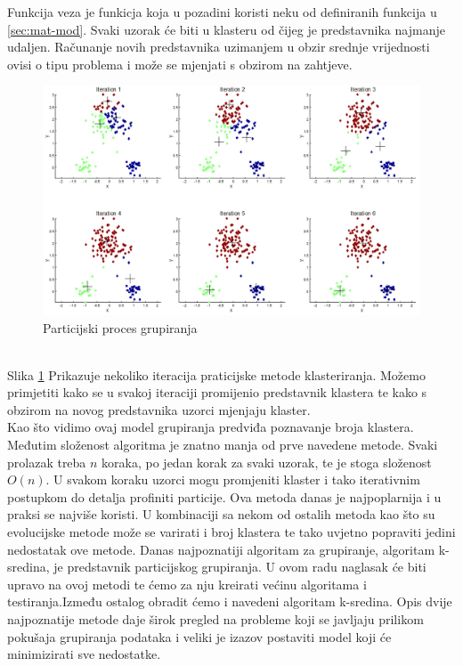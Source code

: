 \documentclass[a4paper,twoside,12pt]{memoir} %
\begin{document}
Funkcija veza je funkicja koja u pozadini koristi neku od definiranih funkcija u \ref{sec:mat-mod}. Svaki uzorak će biti u klasteru od čijeg je predstavnika najmanje udaljen. Računanje novih predstavnika uzimanjem u obzir srednje vrijednosti ovisi o tipu problema i može se mjenjati s obzirom na zahtjeve.
\begin{figure}[h!t]
\centering \includegraphics[scale=0.5]{kmeansclustering.jpg}
\caption{Particijski proces grupiranja}
\label{fig:part_klast}
\end{figure}
\\Slika \ref{fig:part_klast} Prikazuje nekoliko iteracija praticijske metode klasteriranja. Možemo primjetiti kako se u svakoj iteraciji promijenio predstavnik klastera te kako s obzirom na novog predstavnika uzorci mjenjaju klaster. \\
Kao što vidimo ovaj model grupiranja predviđa poznavanje broja klastera. Međutim složenost algoritma je znatno manja od prve navedene metode. Svaki prolazak treba $n$ koraka, po jedan korak za svaki uzorak, te je stoga složenost $O(n)$. U svakom koraku uzorci mogu promjeniti klaster i tako iterativnim postupkom do detalja profiniti particije. Ova metoda danas je najpoplarnija i u praksi se najviše koristi. U kombinaciji sa nekom od ostalih metoda kao što su evolucijske metode može se varirati i broj klastera te tako uvjetno popraviti jedini nedostatak ove metode. Danas najpoznatiji algoritam za grupiranje, algoritam k-sredina, je predstavnik particijskog grupiranja. U ovom radu naglasak će biti upravo na ovoj metodi te ćemo za nju kreirati većinu algoritama i testiranja.Između ostalog obradit ćemo i navedeni algoritam k-sredina. Opis dvije najpoznatije metode daje širok pregled na probleme koji se javljaju prilikom pokušaja grupiranja podataka i veliki je izazov postaviti model koji će minimizirati sve nedostatke.
\end{document}
